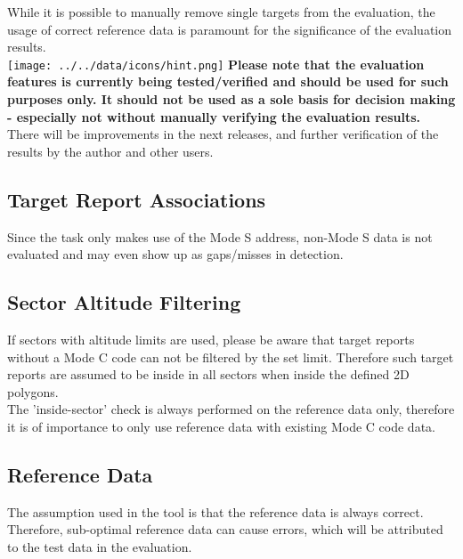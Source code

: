 While it is possible to manually remove single targets from the evaluation, the usage of correct reference data is paramount for the significance of the evaluation results. \\

\texttt{[image: ../../data/icons/hint.png]} \textbf{Please note that the evaluation features is currently being tested/verified and should be used for such purposes only. It should not be used as a sole basis for decision making - especially not without manually verifying the evaluation results.} \\

There will be improvements in the next releases, and further verification of the results by the author and other users.

\subsection{Target Report Associations}

Since the task only makes use of the Mode S address, non-Mode S data is not evaluated and may even show up as gaps/misses in detection.

\subsection{Sector Altitude Filtering}

If sectors with altitude limits are used, please be aware that target reports without a Mode C code can not be filtered by the set limit. Therefore such target reports are assumed to be inside in all sectors when inside the defined 2D polygons. \\

The 'inside-sector' check is always performed on the reference data only, therefore it is of importance to only use reference data with existing Mode C code data.

\subsection{Reference Data}

The assumption used in the tool is that the reference data is always correct. Therefore, sub-optimal reference data can cause errors, which will be attributed to the test data in the evaluation. \\

